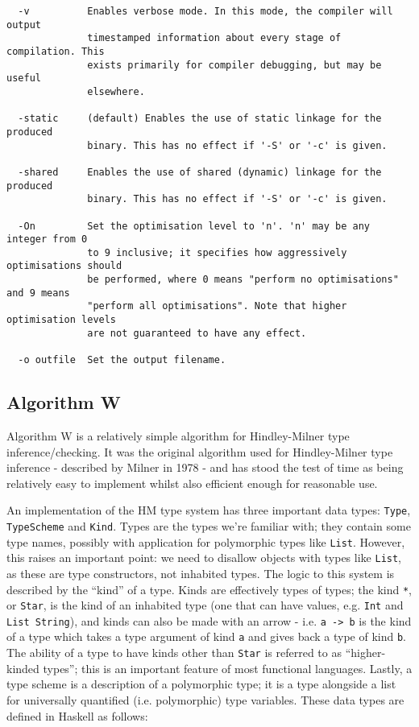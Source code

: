 \documentclass[9pt]{extarticle}
\begin{document}
\begin{verbatim}
  -v          Enables verbose mode. In this mode, the compiler will output
              timestamped information about every stage of compilation. This
              exists primarily for compiler debugging, but may be useful
              elsewhere.

  -static     (default) Enables the use of static linkage for the produced
              binary. This has no effect if '-S' or '-c' is given.

  -shared     Enables the use of shared (dynamic) linkage for the produced
              binary. This has no effect if '-S' or '-c' is given.

  -On         Set the optimisation level to 'n'. 'n' may be any integer from 0
              to 9 inclusive; it specifies how aggressively optimisations should
              be performed, where 0 means "perform no optimisations" and 9 means
              "perform all optimisations". Note that higher optimisation levels
              are not guaranteed to have any effect.

  -o outfile  Set the output filename.

\end{verbatim}

\subsection{Algorithm W}

Algorithm W is a relatively simple algorithm for Hindley-Milner type
inference/checking. It was the original algorithm used for
Hindley-Milner type inference - described by Milner in 1978 - and has
stood the test of time as being relatively easy to implement whilst also
efficient enough for reasonable use.

An implementation of the HM type system has three important data types:
\verb'Type', \verb'TypeScheme' and \verb'Kind'. Types are the types
we're familiar with; they contain some type names, possibly with
application for polymorphic types like \verb'List'. However, this raises
an important point: we need to disallow objects with types like
\verb'List', as these are type constructors, not inhabited types. The
logic to this system is described by the ``kind'' of a type. Kinds are
effectively types of types; the kind \verb'*', or \verb'Star', is the
kind of an inhabited type (one that can have values, e.g. \verb'Int' and
\verb'List String'), and kinds can also be made with an arrow - i.e.
\verb'a -> b' is the kind of a type which takes a type argument of kind
\verb'a' and gives back a type of kind \verb'b'. The ability of a type
to have kinds other than \verb'Star' is referred to as ``higher-kinded
types''; this is an important feature of most functional languages.
Lastly, a type scheme is a description of a polymorphic type; it is a
type alongside a list for universally quantified (i.e. polymorphic) type
variables. These data types are defined in Haskell as follows:
\end{document}
